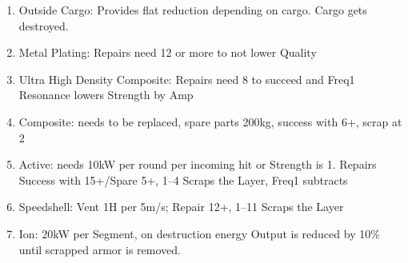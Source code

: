 \begin{enumerate}[label = - ]
    \item Outside Cargo: Provides flat reduction depending on cargo.
    Cargo gets destroyed.
    \item Metal Plating: Repairs need 12 or more to not lower Quality
    \item Ultra High Density Composite: Repairs need 8 to succeed and Freq1 Resonance lowers Strength by Amp
    \item Composite: needs to be replaced, spare parts 200kg, success with 6+, scrap at 2
    \item Active: needs 10kW per round per incoming hit or Strength is 1.
    Repairs Success with 15+/Spare 5+, 1--4 Scraps the Layer, Freq1 subtracts
    \item Speedshell: Vent 1H per 5m/s;
    Repair 12+, 1--11 Scraps the Layer
    \item Ion: 20kW per Segment, on destruction energy Output is reduced by 10\% until scrapped armor is removed.
\end{enumerate}

